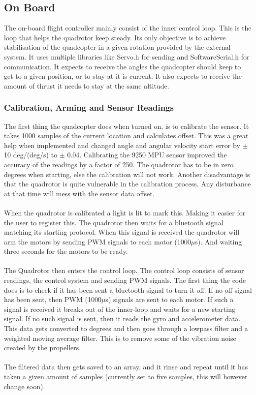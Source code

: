 \subsection{On Board}
The on-board flight controller mainly consist of the inner control loop. This is the loop that helps the quadrotor keep steady. Its only objective is to achieve  stabilisation of the quadcopter in a given rotation provided by the external system. It uses multiple libraries like Servo.h for sending and SoftwareSerial.h for communication. It expects to receive the angles the quadcopter should keep to get to a given position, or to stay at it is current. It also expects to receive the amount of thrust it needs to stay at the same altitude. 

\subsubsection{Calibration, Arming and Sensor Readings}
The first thing the quadcopter does when turned on, is to calibrate the sensor. It takes 1000 samples of the current location and calculates offset. This was a great help when implemented and changed angle and angular velocity start error by $\pm$ 10 deg/(deg/s) to $\pm$ 0.04. Calibrating the 9250 MPU sensor improved the accuracy of the readings by a factor of 250. The quadrotor has to be in zero degrees when starting, else the calibration will not work. Another disadvantage is that the quadrotor is quite vulnerable in the calibration process. Any disturbance at that time will mess with the sensor data offset.
\\\\
When the quadrotor is calibrated a light is lit to mark this. Making it easier for the user to register this. The quadrotor then waits for a bluetooth signal matching its starting protocol. When this signal is received the quadrotor will arm the motors by sending PWM signals to each motor (1000$\mu$s). And waiting three seconds for the motors to be ready. 
\\\\
The Quadrotor then enters the control loop. The control loop consists of sensor readings, the control system and sending PWM signals. The first thing the code does is to check if it has been sent a bluetooth signal to turn it off. If no off signal has been sent, then PWM (1000$\mu$s) signals are sent to each motor. If such a signal is received it breaks out of the inner-loop and waits for a new starting signal. If no such signal is sent, then it reads the gyro and accelerometer data. This data gets converted to degrees and then goes through a lowpass filter and a weighted moving average filter. This is to remove some of the vibration noise created by the propellers. 
\\\\
The filtered data then gets saved to an array, and it rinse and repeat until it has taken a given amount of samples (currently set to five samples, this will however change soon). \\
\newpage
